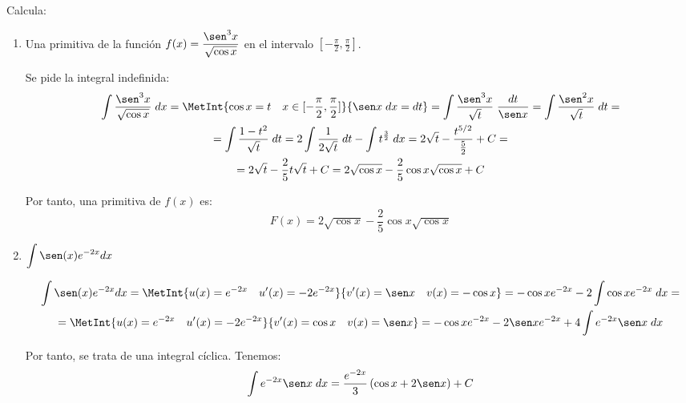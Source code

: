 \documentclass[12pt]{article}
\begin{document}
\begin{ejercicio}
    Calcula:
    \begin{enumerate}
        \item Una primitiva de la función $f(x)=\displaystyle \frac{\sen^3 x}{\sqrt{\cos x}}$ en el intervalo $\left[-\frac{\pi}{2},\frac{\pi}{2}\right]$.

        Se pide la integral indefinida:
        \begin{multline*}
            \int \frac{\sen^3 x}{\sqrt{\cos x}}\;dx =\MetInt{\cos x=t\quad x\in [-\frac{\pi}{2},\frac{\pi}{2}]}{\sen x\;dx = dt}
            = \int \frac{\sen^3 x}{\sqrt{t}}\;\frac{dt}{\sen x}
            = \int \frac{\sen^2 x}{\sqrt{t}}\;dt
            =\\
            = \int \frac{1-t^2}{\sqrt{t}}\;dt
            = 2\int \frac{1}{2\sqrt{t}}\;dt -\int t^{\frac{3}{2}}\;dx
            = 2\sqrt{t} - \frac{t^{5/2}}{\frac{5}{2}} +C
            =\\= 2\sqrt{t} -\frac{2}{5}t\sqrt{t} +C
            = 2\sqrt{\cos x} -\frac{2}{5}\cos x\sqrt{\cos x} +C
        \end{multline*}

        Por tanto, una primitiva de $f(x)$ es:
        \begin{equation*}
            F(x)=2\sqrt{\cos x} -\frac{2}{5}\cos x\sqrt{\cos x}
        \end{equation*}

        \item $\displaystyle \int\sen(x)e^{-2x}dx$ 

        \begin{multline*}
            \int\sen(x)e^{-2x}dx=\MetInt{u(x)=e^{-2x}\quad u'(x)=-2e^{-2x}}{v'(x)=\sen x \quad v(x)=-\cos x} = -\cos x e^{-2x} -2\int \cos x e^{-2x}\;dx
            =\\=\MetInt{u(x)=e^{-2x}\quad u'(x)=-2e^{-2x}}{v'(x)=\cos x \quad v(x)=\sen x}
            = -\cos x e^{-2x}-2\sen x e^{-2x}+4\int e^{-2x}\sen x\;dx
        \end{multline*}

        Por tanto, se trata de una integral cíclica. Tenemos:
        \begin{equation*}
            \int e^{-2x}\sen x\;dx = \frac{e^{-2x}}{3}\left(\cos x +2\sen x\right)+C
        \end{equation*}
    \end{enumerate}
\end{ejercicio}
    
\end{document}
